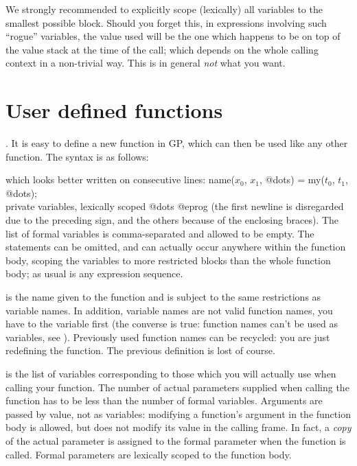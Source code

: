 We strongly recommended to explicitly scope (lexically) all variables to the
smallest possible block. Should you forget this, in expressions involving such
``rogue'' variables, the value used will be the one which happens to be on
top of the value stack at the time of the call; which depends on the whole
calling context in a non-trivial way. This is in general \emph{not} what you
want.

\section{User defined functions}
\label{se:user_defined}

.
It is easy to define a new function in GP, which can then be used like any
other function. The syntax is as follows:

\kbd{);}

\noindent which looks better written on consecutive lines:
\bprogpart
name($x_0$, $x_1$, @dots) =
{
  my($t_0$, $t_1$, @dots); \\ private variables, lexically scoped
  @dots
}
@eprog \noindent
(the first newline is disregarded due to the preceding \kbd{=} sign, and the
others because of the enclosing braces). The list of formal variables
is comma-separated and allowed to be empty. The  statements can be
omitted, and can actually occur anywhere within the function body, scoping
the variables to more restricted blocks than the whole function body; as
usual  is any expression sequence.

\noindent {} is the name given to the function and is subject to the
same restrictions as variable names. In addition, variable names are not
valid function names, you have to  the variable first (the converse
is true: function names can't be used as variables, see ).
Previously used function names can be recycled: you are just redefining the
function. The previous definition is lost of course.

\noindent {} is the list of variables
corresponding to those which you will actually use when calling your
function. The number of actual parameters supplied when calling the function
has to be less than the number of formal variables. Arguments are passed by
value, not as variables: modifying a function's argument in the function
body is allowed, but does not modify its value in the calling frame. In fact,
a \emph{copy} of the actual parameter is assigned to the formal parameter
when the function is called. Formal parameters are lexically scoped to the
function body.

